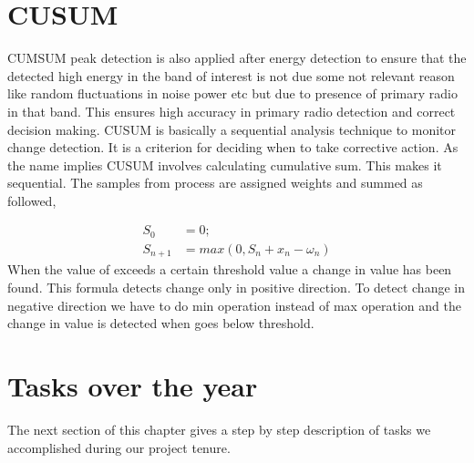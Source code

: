 \section{CUSUM}
CUMSUM peak detection is also applied after energy detection to ensure that the
detected high energy in the band of interest is not due some  not relevant 
reason like random fluctuations in noise power etc but due to presence of 
primary radio in that band. This ensures high accuracy in primary radio 
detection and correct decision making.
CUSUM is basically a sequential analysis technique to monitor change detection. 
It is a criterion for deciding when to take corrective action. As the name 
implies CUSUM involves calculating cumulative sum. This makes it sequential. 
The samples from process  are assigned weights  and summed as followed,

\begin{align}
S_0 &= 0; \nonumber \\
S_{n+1} &= max(0, S_n + x_n - \omega_n) \nonumber
\end{align}
When the value of  exceeds a certain threshold value a change  in value has 
been found. This formula detects change only in positive direction. To detect 
change in negative direction we have to do min operation instead of max 
operation and the change in value is detected when goes below threshold.







\section{Tasks over the year}
The next section of this chapter gives a step by step description of tasks we 
accomplished during our project tenure. 


